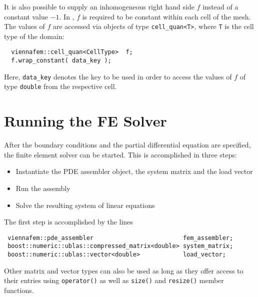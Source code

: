 It is also possible to supply an inhomogeneous right hand side $f$ instead of a constant value $-1$.
In {\ViennaMathversion}, $f$ is required to be constant within each cell of the mesh.
The values of $f$ are accessed via objects of type \lstinline|cell_quan<T>|, where \lstinline|T| is the cell type of the {\ViennaGrid}
domain:
\begin{lstlisting}
  viennafem::cell_quan<CellType>  f;
  f.wrap_constant( data_key );
\end{lstlisting}
Here, \lstinline|data_key| denotes the key to be used in order to access the values of $f$ of type \lstinline|double| from the respective cell.


\section{Running the FE Solver}
After the boundary conditions and the partial differential equation are specified, the finite element solver can be started.
This is accomplished in three steps:
\begin{itemize}
 \item Instantiate the PDE assembler object, the system matrix and the load vector
 \item Run the assembly
 \item Solve the resulting system of linear equations
\end{itemize}

The first step is accomplished by the lines
\begin{lstlisting}
 viennafem::pde_assembler                         fem_assembler;
 boost::numeric::ublas::compressed_matrix<double> system_matrix;
 boost::numeric::ublas::vector<double>            load_vector;
\end{lstlisting}
Other matrix and vector types can also be used as long as they offer access to their entries using \lstinline|operator()| as well as \lstinline|size()| and \lstinline|resize()| member functions.

